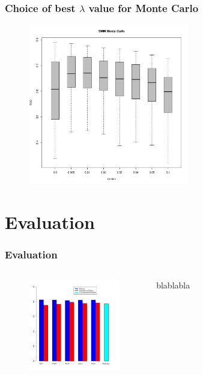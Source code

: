 \documentclass[presentation]{beamer}   %
\begin{document}
\begin{frame}[plain]
  \frametitle{Choice of best $\lambda$ value for Monte Carlo}
	\begin{figure}
		\centering
		\includegraphics[width=70mm,height=70mm]{fig/choice_lambda_mc.pdf}
	\end{figure}
\end{frame}
\section{Evaluation}
\begin{frame}
  \frametitle{Evaluation}
  \begin{columns}[t] %
		\begin{figure}
		\centering
			\includegraphics[width=40mm,height=40mm]{fig/barplot.pdf}
		\end{figure}
		\centering
		\begin{block}\centering
		blablabla
		\end{block}
  \end{columns}

\end{frame}
\end{document}
